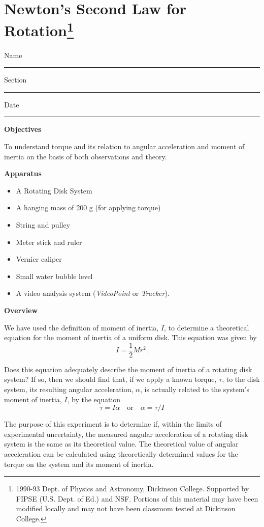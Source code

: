 
\section{Newton's Second Law for Rotation\footnote{
1990-93 Dept. of Physics and Astronomy, Dickinson College. Supported by FIPSE
(U.S. Dept. of Ed.) and NSF. Portions of this material may have been modified
locally and may not have been classroom tested at Dickinson College.
}}

Name \rule{2.0in}{0.1pt}\hfill{}Section \rule{1.0in}{0.1pt}\hfill{}Date \rule{1.0in}{0.1pt}

\textbf{Objectives} 

To understand torque and its relation to angular acceleration and moment of
inertia on the basis of both observations and theory. 

\textbf{Apparatus}

\begin{itemize}
\item A Rotating Disk System 
\item A hanging mass of 200 g (for applying torque) 
\item String and pulley
\item Meter stick and ruler
\item Vernier caliper
\item Small water bubble level
\item A video analysis system (\textit{VideoPoint} or \textit{Tracker}).
\end{itemize}
\textbf{Overview} 

We have used the definition of moment of inertia, $I$, to determine a theoretical equation for the moment of inertia of a uniform disk. This equation was given by
\[
I=\frac{1}{2}Mr^{2}.\]


Does this equation adequately describe the moment of inertia of a rotating
disk system? If so, then we should find that, if we apply a known torque, \( \tau  \), to the disk system, its resulting angular acceleration, \( \alpha  \), is actually related to the system's moment of inertia, $I$, by the equation
\[
\tau =I\alpha \quad \mbox{or}\quad \alpha =\tau /I\]


The purpose of this experiment is to determine if, within the limits of experimental
uncertainty, the measured angular acceleration of a rotating disk system is
the same as its theoretical value. The theoretical value of angular acceleration can be calculated using theoretically determined values for the torque on the
system and its moment of inertia.

